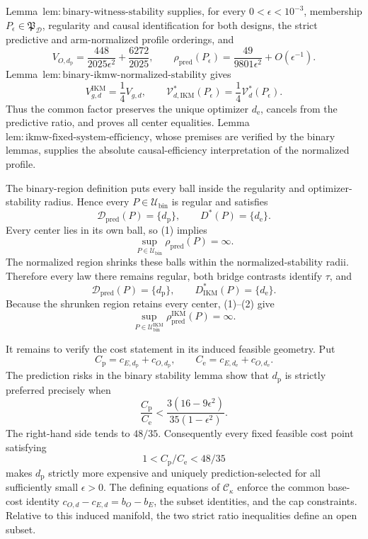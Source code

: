 Lemma~\(\mathrm{lem{:}binary\text{-}witness\text{-}stability}\) supplies, for every \(0<\epsilon<10^{-3}\), membership \(P_\epsilon\in\mathfrak P_{\mathcal D}\), regularity and causal identification for both designs, the strict predictive and arm-normalized profile orderings, and
\[
V_{O,d_{\mathrm p}}
=\frac{448}{2025\epsilon^2}+\frac{6272}{2025},\qquad
\rho_{\mathrm{pred}}(P_\epsilon)
=\frac{49}{9801\epsilon^2}+O(\epsilon^{-1}).                      \tag{1}
\]
Lemma~\(\mathrm{lem{:}binary\text{-}ikmw\text{-}normalized\text{-}stability}\) gives
\[
V_{g,d}^{\mathrm{IKM}}=\frac14V_{g,d},\qquad
\mathcal V_{d,\mathrm{IKM}}^*(P_\epsilon)
=\frac14\mathcal V_d^*(P_\epsilon).                               \tag{2}
\]
Thus the common factor preserves the unique optimizer \(d_{\mathrm e}\), cancels from the predictive ratio, and proves all center equalities.  Lemma~\(\mathrm{lem{:}ikmw\text{-}fixed\text{-}system\text{-}efficiency}\), whose premises are verified by the binary lemmas, supplies the absolute causal-efficiency interpretation of the normalized profile.

The binary-region definition puts every ball inside the regularity and optimizer-stability radius.  Hence every \(P\in\mathcal U_{\mathrm{bin}}\) is regular and satisfies
\[
\mathcal D_{\mathrm{pred}}(P)=\{d_{\mathrm p}\},\qquad
D^*(P)=\{d_{\mathrm e}\}.
\]
Every center lies in its own ball, so (1) implies
\[
\sup_{P\in\mathcal U_{\mathrm{bin}}}\rho_{\mathrm{pred}}(P)=\infty.\tag{3}
\]
The normalized region shrinks these balls within the normalized-stability radii.  Therefore every law there remains regular, both bridge contrasts identify \(\tau\), and
\[
\mathcal D_{\mathrm{pred}}(P)=\{d_{\mathrm p}\},\qquad
D_{\mathrm{IKM}}^*(P)=\{d_{\mathrm e}\}.
\]
Because the shrunken region retains every center, (1)--(2) give
\[
\sup_{P\in\mathcal U_{\mathrm{bin}}^{\mathrm{IKM}}}
\rho_{\mathrm{pred}}^{\mathrm{IKM}}(P)=\infty.                    \tag{4}
\]

It remains to verify the cost statement in its induced feasible geometry.  Put
\[
C_{\mathrm p}=c_{E,d_{\mathrm p}}+c_{O,d_{\mathrm p}},\qquad
C_{\mathrm e}=c_{E,d_{\mathrm e}}+c_{O,d_{\mathrm e}}.
\]
The prediction risks in the binary stability lemma show that \(d_{\mathrm p}\) is strictly preferred precisely when
\[
\frac{C_{\mathrm p}}{C_{\mathrm e}}
<\frac{3(16-9\epsilon^2)}{35(1-\epsilon^2)}.                       \tag{5}
\]
The right-hand side tends to \(48/35\).  Consequently every fixed feasible cost point satisfying
\[
1<C_{\mathrm p}/C_{\mathrm e}<48/35
\]
makes \(d_{\mathrm p}\) strictly more expensive and uniquely prediction-selected for all sufficiently small \(\epsilon>0\).  The defining equations of \(\mathcal C_\kappa\) enforce the common base-cost identity \(c_{O,d}-c_{E,d}=b_O-b_E\), the subset identities, and the cap constraints.  Relative to this induced manifold, the two strict ratio inequalities define an open subset.

